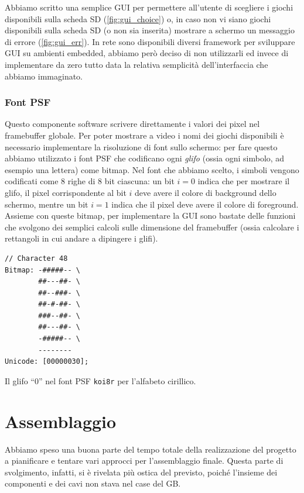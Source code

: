 \documentclass[hidelinks,12pt]{article}
\begin{document}
Abbiamo scritto una semplice GUI per permettere all'utente di scegliere i giochi
disponibili sulla scheda SD (\cref{fig:gui_choice}) o, in caso non vi siano
giochi disponibili sulla scheda SD (o non sia inserita) mostrare a schermo un
messaggio di errore (\cref{fig:gui_err}).
In rete sono disponibili diversi framework per sviluppare GUI su ambienti
embedded, abbiamo però deciso di non utilizzarli ed invece di implementare
da zero tutto data la relativa semplicità dell'interfaccia che abbiamo immaginato.

\subsubsection{Font PSF}
Questo componente software scrivere direttamente i valori dei pixel nel
framebuffer globale. Per poter mostrare a video i nomi dei giochi disponibili è
necessario implementare la risoluzione di font sullo schermo: per fare questo
abbiamo utilizzato i font PSF che codificano ogni \textit{glifo} (ossia ogni
simbolo, ad esempio una lettera) come bitmap. Nel font che abbiamo scelto, i
simboli vengono codificati come $8$ righe di $8$ bit ciascuna: un bit $i = 0$
indica che per mostrare il glifo, il pixel corrispondente al bit $i$ deve avere
il colore di background dello schermo, mentre un bit $i = 1$ indica che il pixel
deve avere il colore di foreground. Assieme con queste bitmap, per implementare
la GUI sono bastate delle funzioni che svolgono dei  semplici calcoli sulle
dimensione del framebuffer (ossia calcolare i rettangoli in cui andare a
dipingere i glifi). 
\begin{table}[h]
  \begin{verbatim}
// Character 48
Bitmap: -#####-- \
        ##---##- \
        ##--###- \
        ##-#-##- \
        ###--##- \
        ##---##- \
        -#####-- \
        --------
Unicode: [00000030];
  \end{verbatim}
  \caption{Il glifo ``0'' nel font PSF \texttt{koi8r} per l'alfabeto cirillico.}
\end{table}

\section{Assemblaggio}
Abbiamo speso una buona parte del tempo totale della realizzazione del progetto
a pianificare e tentare vari approcci per l'assemblaggio finale. Questa parte di
svolgimento, infatti, si è rivelata più ostica del previsto, poiché l'insieme
dei componenti e dei cavi non stava nel case del GB.
\end{document}
